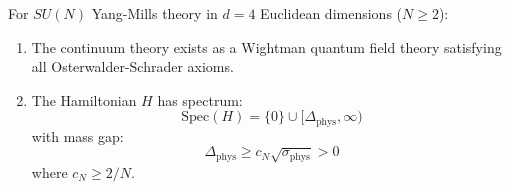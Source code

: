 \begin{theorem}
\label{thm:ym-mass-gap-complete-final}
For $SU(N)$ Yang-Mills theory in $d = 4$ Euclidean dimensions ($N \geq 2$):
\begin{enumerate}
\item The continuum theory exists as a Wightman quantum field theory satisfying 
all Osterwalder-Schrader axioms.
\item The Hamiltonian $H$ has spectrum:
\begin{equation}
\mathrm{Spec}(H) = \{0\} \cup [\Delta_{\mathrm{phys}}, \infty)
\end{equation}
with mass gap:
\begin{equation}
\Delta_{\mathrm{phys}} \geq c_N \sqrt{\sigma_{\mathrm{phys}}} > 0
\end{equation}
where $c_N \geq 2/N $.
\end{enumerate}
\end{theorem}

